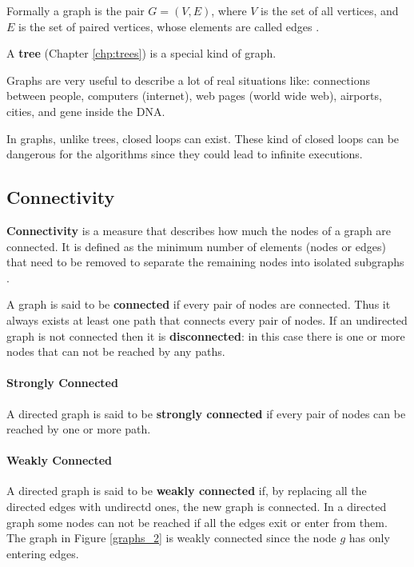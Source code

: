 Formally a graph is the pair \(G=(V, E)\), where \(V\) is the set of all vertices, and \(E\) is the set of paired vertices, whose elements are called edges \cite{wikigraphmath}.

A \textbf{tree} (Chapter \ref{chp:trees}) is a special kind of graph.

Graphs are very useful to describe a lot of real situations like: connections between people, computers (internet), web pages (world wide web), airports, cities, and gene inside the DNA.

In graphs, unlike trees, closed loops can exist. These kind of closed loops can be dangerous for the algorithms since they could lead to infinite executions.

\subsection{Connectivity}
\textbf{Connectivity} is a measure that describes how much the nodes of a graph are connected. It is defined as the minimum number of elements (nodes or edges) that need to be removed to separate the remaining nodes into isolated subgraphs \cite{wikiconnectivity}.

A graph is said to be \textbf{connected} if every pair of nodes are connected. Thus it always exists at least one path that connects every pair of nodes. If an undirected graph is not connected then it is \textbf{disconnected}: in this case there is one or more nodes that can not be reached by any paths.

\paragraph{Strongly Connected}
A directed graph is said to be \textbf{strongly connected} if every pair of nodes can be reached by one or more path.

\paragraph{Weakly Connected}
A directed graph is said to be \textbf{weakly connected} if, by replacing all the directed edges with undirectd ones, the new graph is connected. In a directed graph some nodes can not be reached if all the edges exit or enter from them. The graph in Figure \ref{graphs_2} is weakly connected since the node \(g\) has only entering edges.

